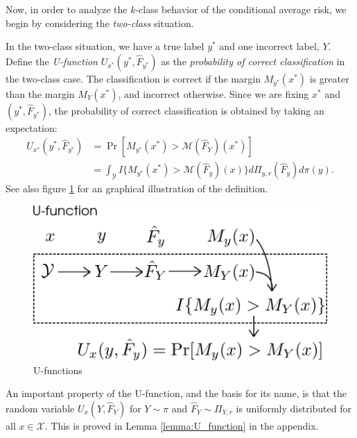 \documentclass[12pt]{article}
\begin{document}
Now, in order to analyze the $k$-class behavior of the conditional
average risk, we begin by considering the \emph{two-class} situation.

In the two-class situation, we have a true label $y^*$ and one
incorrect label, $Y$.  Define the \emph{U-function}
$U_{x^*}(y^*, \hat{F}_{y^*})$ as the \emph{probability of correct
classification} in the two-class case.
The classification is correct if the margin
$M_{y^*}(x^*)$ is greater than the margin $M_Y(x^*)$, and incorrect
otherwise.  
Since we are fixing $x^*$ and $(y^*, \hat{F}_{y^*})$, the
probability of correct classification is obtained by taking an expectation:
\begin{align}\label{eq:U_function}
U_{x^*}(y^*, \hat{F}_{y^*}) &= \Pr[M_{y^*}(x^*) > \mathcal{M}(\hat{F}_Y)(x^*)]
\\&= \int_{\mathcal{Y}} 
I\{
M_{y^*}(x^*) > \mathcal{M}(\hat{F}_{y})(x)
\}
d\Pi_{y, r}(\hat{F}_y)
d\pi(y).
\end{align}
See also figure \ref{fig:U_function} for an graphical illustration of
the definition.

\begin{figure}[h]
\centering
\includegraphics[scale = 0.4]{extrapolation_figures/U_function.png}
\caption{U-functions}\label{fig:U_function}
\end{figure}

An important property of the U-function, and the basis for its name,
is that the random variable $U_x(Y, \hat{F}_Y)$ for $Y \sim \pi$ and
$\hat{F}_Y \sim \Pi_{Y, r}$ is uniformly distributed for all
$x \in \mathcal{X}$.  This is proved in Lemma \ref{lemma:U_function}
in the appendix.
\end{document}
